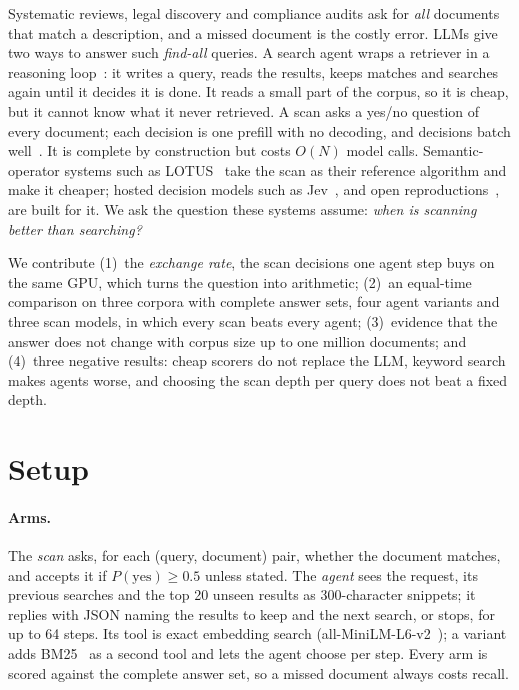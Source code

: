\documentclass[sigconf,nonacm]{acmart}
\begin{document}
Systematic reviews, legal discovery and compliance audits ask for \emph{all}
documents that match a description, and a missed document is the costly error.
LLMs give two ways to answer such \emph{find-all} queries. A search agent wraps
a retriever in a reasoning loop~\cite{yao2023react}: it writes a query, reads
the results, keeps matches and searches again until it decides it is done. It
reads a small part of the corpus, so it is cheap, but it cannot know what it
never retrieved. A scan asks a yes/no question of every document; each decision
is one prefill with no decoding, and decisions batch well~\cite{kwon2023vllm}.
It is complete by construction but costs $O(N)$ model calls. Semantic-operator
systems such as LOTUS~\cite{patel2024lotus} take the scan as their reference
algorithm and make it cheaper; hosted decision models such as
Jev~\cite{typesafe_jev}, and open reproductions~\cite{kev,jev9b}, are built for
it. We ask the question these systems assume: \emph{when is scanning better than
searching?}

We contribute (1)~the \emph{exchange rate}, the scan decisions one agent step
buys on the same GPU, which turns the question into arithmetic; (2)~an
equal-time comparison on three corpora with complete answer sets, four agent
variants and three scan models, in which every scan beats every agent;
(3)~evidence that the answer does not change with corpus size up to one million
documents; and (4)~three negative results: cheap scorers do not replace the LLM,
keyword search makes agents worse, and choosing the scan depth per query does
not beat a fixed depth.

\section{Setup}

\paragraph{Arms.}
The \emph{scan} asks, for each (query, document) pair, whether the document
matches, and accepts it if $P(\text{yes}) \ge 0.5$ unless stated. The
\emph{agent} sees the request, its previous searches and the top 20 unseen
results as 300-character snippets; it replies with JSON naming the results to
keep and the next search, or stops, for up to 64 steps. Its tool is exact
embedding search (all-MiniLM-L6-v2~\cite{reimers2019sbert}); a variant adds
BM25~\cite{robertson2009bm25} as a second tool and lets the agent choose per
step. Every arm is scored against the complete answer set, so a missed
document always costs recall.
\end{document}
